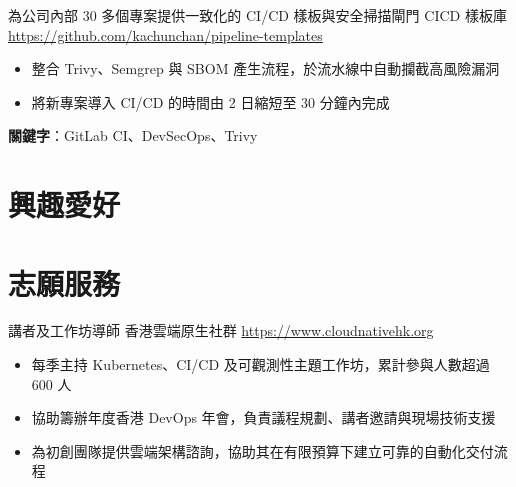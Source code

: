 \documentclass[a4paper, serif, 10pt]{moderncv}
\begin{document}
        {為公司內部 30 多個專案提供一致化的 CI/CD 樣板與安全掃描閘門}
        {CICD 樣板庫}
        {\url{https://github.com/kachunchan/pipeline-templates}}
        {}
        {\begin{itemize}
\item 整合 Trivy、Semgrep 與 SBOM 產生流程，於流水線中自動攔截高風險漏洞
\item 將新專案導入 CI/CD 的時間由 2 日縮短至 30 分鐘內完成
\end{itemize}
\textbf{關鍵字}：GitLab CI、DevSecOps、Trivy}
\section{興趣愛好}

\section{志願服務}

        {講者及工作坊導師}
        {香港雲端原生社群}
        {\url{https://www.cloudnativehk.org}}
        {}
        {\begin{itemize}
\item 每季主持 Kubernetes、CI/CD 及可觀測性主題工作坊，累計參與人數超過 600 人
\item 協助籌辦年度香港 DevOps 年會，負責議程規劃、講者邀請與現場技術支援
\item 為初創團隊提供雲端架構諮詢，協助其在有限預算下建立可靠的自動化交付流程
\end{itemize}}
    
\end{document}
